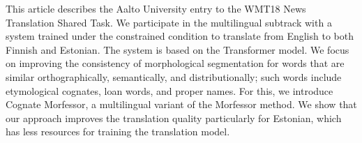 This article describes the Aalto University entry to the WMT18 News Translation Shared Task. We participate in the multilingual subtrack with a system trained under the constrained condition to translate from English to both Finnish and Estonian. The system is based on the Transformer model. We focus on improving the consistency of morphological segmentation for words that are similar orthographically, semantically, and distributionally; such words include etymological cognates, loan words, and proper names. For this, we introduce Cognate Morfessor, a multilingual variant of the Morfessor method. We show that our approach improves the translation quality particularly for Estonian, which has less resources for training the translation model.
